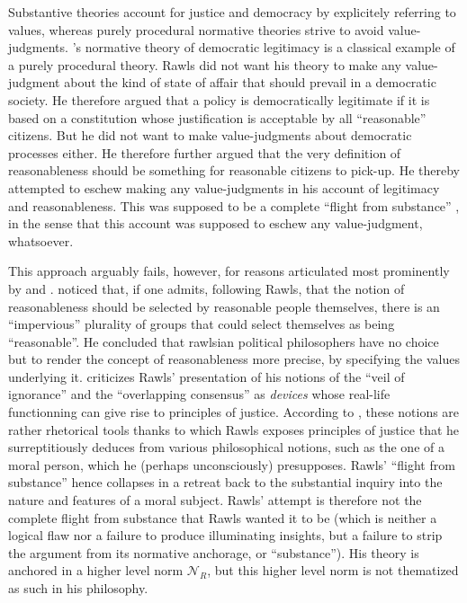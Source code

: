 \documentclass[preprint, french, english, 11pt, authoryear]{elsarticle}%
\begin{document}
Substantive theories account for justice and democracy by explicitely referring to values, whereas purely procedural normative theories strive to avoid value-judgments. \cite{rawls_political_2005}'s normative theory of democratic legitimacy is a classical example of a purely procedural theory. Rawls did not want his theory to make any value-judgment about the kind of state of affair that should prevail in a democratic society. He therefore argued that a policy is democratically legitimate if it is based on a constitution whose justification is acceptable by all  “reasonable” citizens. But he did not want to make value-judgments about democratic processes either. He therefore further argued that the very definition of reasonableness should be something for reasonable citizens to pick-up. He thereby attempted to eschew making any value-judgments in his account of legitimacy and reasonableness. This was supposed to be a complete ``flight from substance'' \citep{estlund_democratic_2009}, in the sense that this account was supposed to eschew any value-judgment, whatsoever.%

This approach arguably fails, however, for reasons articulated most prominently by \cite{habermas_reconciliation_1995} and \cite{estlund_democratic_2009}. \citet{estlund_democratic_2009} noticed that, if one admits, following Rawls, that the notion of reasonableness should be selected by reasonable people themselves, there is an “impervious” plurality of groups that could select themselves as being “reasonable”. He concluded that rawlsian political philosophers have no choice but to render the concept of reasonableness more precise, by specifying the values underlying it. \cite{habermas_reconciliation_1995} criticizes Rawls' presentation of his notions of the “veil of ignorance” and the “overlapping consensus” as \emph{devices} whose real-life functionning can give rise to principles of justice. According to \cite{habermas_reconciliation_1995}, these notions are rather rhetorical tools thanks to which Rawls exposes principles of justice that he surreptitiously deduces from various philosophical notions, such as the one of a moral person, which he (perhaps unconsciously) presupposes. Rawls' ``flight from substance'' hence collapses in a retreat back to the substantial inquiry into the nature and features of a moral subject.  Rawls' attempt is therefore not the complete flight from substance that Rawls wanted it to be (which is neither a logical flaw nor a failure to produce illuminating insights, but a failure to strip the argument from its normative anchorage, or “substance”). His theory is anchored in a higher level norm $\mathscr{N}_R$, but this higher level norm is not thematized as such in his philosophy.
\end{document}
